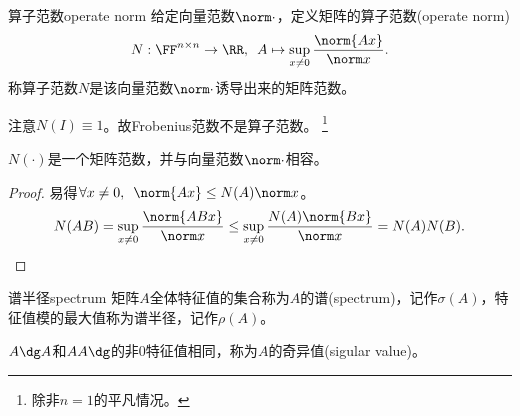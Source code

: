 \begin{definition}
    {算子范数}{operate norm}
    给定向量范数$\norm\cdot$，定义矩阵的算子范数(operate norm)
    \begin{equation}
        N:\FF^{n\times n}\to\RR,\enspace A\mapsto\sup_{x\neq 0}\frac{\norm{Ax}}{\norm x}.
    \end{equation}
    称算子范数$N$是该向量范数$\norm\cdot$诱导出来的矩阵范数。
\end{definition}

\begin{remark}
    注意$N(I)\equiv 1$。故Frobenius范数不是算子范数。
    \footnote{除非$n=1$的平凡情况。}
\end{remark}

\begin{theorem}
    {}{}
    $N(\cdot)$是一个矩阵范数，并与向量范数$\norm\cdot$相容。 
\end{theorem}

\begin{proof}
    易得$\forall x\neq 0,\enspace\norm{Ax}\leq N(A)\norm x$。
    \[
        N(AB)=\sup_{x\neq 0}\frac{\norm{ABx}}{\norm x}\leq\sup_{x\neq 0}\frac{N(A)\norm{Bx}}{\norm x}=N(A)N(B).
        \qedhere
    \]
\end{proof}

\begin{definition}
    {谱半径}{spectrum}
    矩阵$A$全体特征值的集合称为$A$的谱(spectrum)，记作$\sigma(A)$，特征值模的最大值称为谱半径，记作$\rho(A)$。
\end{definition}

\begin{remark}
    $A\dg A$和$AA\dg$的非0特征值相同，称为$A$的奇异值(sigular value)。
\end{remark}


